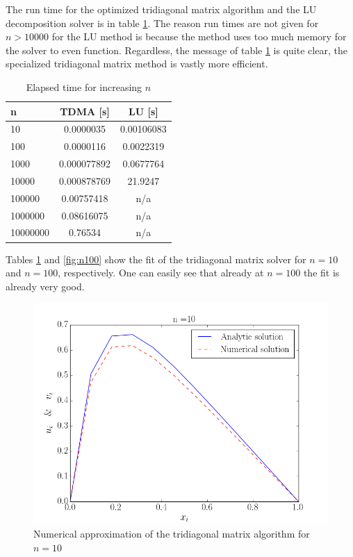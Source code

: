 \documentclass[10pt, a4paper]{amsart}
\begin{document}
The run time for the optimized tridiagonal matrix algorithm and the LU
decomposition solver is in table \ref{tab:solver_times}. The reason
run times are not given for $n>10000$ for the LU method is because the
method uses too much memory for the solver to even
function. Regardless, the message of table \ref{tab:solver_times} is
quite clear, the specialized tridiagonal matrix method is vastly more
efficient.

\begin{table}[h]
\caption{Elapsed time for increasing $n$}
\begin{tabular}{lcc}
\hline
n & TDMA [s] & LU [s] \\ \hline
10 & 0.0000035 & 0.00106083 \\
100 & 0.0000116 & 0.0022319 \\
1000 & 0.000077892 & 0.0677764 \\
10000 & 0.000878769 & 21.9247 \\
100000 & 0.00757418 & n/a \\
1000000 & 0.08616075 & n/a \\
10000000 & 0.76534 & n/a
\end{tabular}
\label{tab:solver_times}
\end{table}

Tables \ref{fig:n10} and \ref{fig:n100} show the fit of the
tridiagonal matrix solver for $n=10$ and $n=100$, respectively. One
can easily see that already at $n=100$ the fit is already very
good.  

\begin{figure}[h]
  \centering
  \includegraphics[width=0.9\linewidth]{figures/10.png}
  \caption{Numerical approximation of the tridiagonal matrix algorithm for $n=10$}
  \label{fig:n10}
\end{figure}
\end{document}
